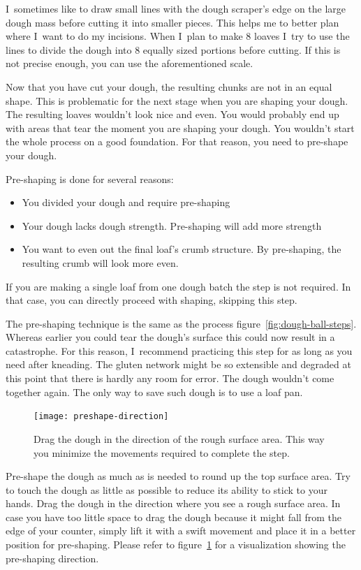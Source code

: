 I~sometimes like to draw small lines with the dough scraper's edge
on the large dough mass before cutting it into smaller pieces.
This helps me to better plan where I~want to do my incisions. When
I~plan to make 8 loaves I~try to use the lines to divide the dough
into 8 equally sized portions before cutting. If this is not precise enough,
you can use the aforementioned scale.

Now that you have cut your dough, the resulting chunks are not in an equal shape.
This is problematic for the next stage when you are shaping your dough.
The resulting loaves wouldn't look nice and even. You would probably
end up with areas that tear the moment you are shaping your dough.
You wouldn't start the whole process on a good foundation. For that
reason, you need to pre-shape your dough.

Pre-shaping is done for several reasons:
\begin{itemize}
  \item You divided your dough and require pre-shaping
  \item Your dough lacks dough strength. Pre-shaping will add more strength
  \item You want to even out the final loaf's crumb structure. By pre-shaping,
  the resulting crumb will look more even.
\end{itemize}

If you are making a single loaf from one dough batch the step is not required.
In that case, you can directly proceed with shaping, skipping this step.

The pre-shaping technique is the same as the process figure~\ref{fig:dough-ball-steps}.
Whereas earlier you could tear the dough's surface this could now result in a catastrophe.
For this reason, I~recommend practicing this step for as long as you need after kneading.
The gluten network might be so extensible and degraded at this point that there
is hardly any room for error. The dough wouldn't come together again. The only
way to save such dough is to use a loaf pan.

\begin{figure}[!htb]
  \texttt{[image: preshape-direction]}
  \caption[Dragging direction]{Drag the dough in the direction of the rough
      surface area. This way you minimize the movements required to complete
      the step.}%
  \label{fig:preshape-direction}
\end{figure}

Pre-shape the dough as much as is needed to round up the top
surface area. Try to touch the dough as little as possible
to reduce its ability to stick to your hands. Drag the dough
in the direction where you see a rough surface area. In
case you have too little space to drag the dough because it might
fall from the edge of your counter, simply lift it with a swift movement and place
it in a better position for pre-shaping. Please refer to figure~\ref{fig:preshape-direction}
for a visualization showing the pre-shaping direction.

